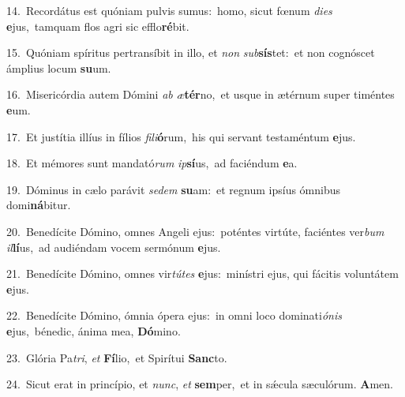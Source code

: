 {\numbfont\textcolor{\numbcolor}{14.}}~Recordátus est quóniam pulvis sumus:~\dagger homo, sicut fœnum \textit{di}\-\textit{es} \textbf{e}\-jus,~\star tamquam flos agri sic efflo\-\textbf{ré}\-bit.\par
{\numbfont\textcolor{\numbcolor}{15.}}~Quóniam spíritus pertransíbit in illo, et \textit{non} \textit{sub}\-\textbf{sís}tet:~\star et non cognóscet ámplius locum \textbf{su}\-um.\par
{\numbfont\textcolor{\numbcolor}{16.}}~Misericórdia autem Dómini \textit{ab} \textit{æ}\-\textbf{tér}no,~\star et usque in ætérnum super timéntes \textbf{e}\-um.\par
{\numbfont\textcolor{\numbcolor}{17.}}~Et justítia illíus in fílios \textit{fi}\-\textit{li}\textbf{ó}rum,~\star his qui servant testaméntum \textbf{e}\-jus.\par
{\numbfont\textcolor{\numbcolor}{18.}}~Et mémores sunt mandató\textit{rum} \textit{ip}\-\textbf{sí}us,~\star ad faciéndum \textbf{e}\-a.\par
{\numbfont\textcolor{\numbcolor}{19.}}~Dóminus in cælo parávit \textit{se}\-\textit{dem} \textbf{su}\-am:~\star et regnum ipsíus ómnibus domi\-\textbf{ná}\-bitur.\par
{\numbfont\textcolor{\numbcolor}{20.}}~Benedícite Dómino, omnes Angeli ejus:~\dagger poténtes virtúte, faciéntes ver\textit{bum} \textit{il}\-\textbf{lí}us,~\star ad audiéndam vocem sermónum \textbf{e}\-jus.\par
{\numbfont\textcolor{\numbcolor}{21.}}~Benedícite Dómino, omnes vir\-\textit{tú}\-\textit{tes} \textbf{e}\-jus:~\star minístri ejus, qui fácitis voluntátem \textbf{e}\-jus.\par
{\numbfont\textcolor{\numbcolor}{22.}}~Benedícite Dómino, ómnia ópera ejus:~\dagger in omni loco dominati\-\textit{ó}\-\textit{nis} \textbf{e}\-jus,~\star bénedic, ánima mea, \textbf{Dó}\-mino.\par
{\numbfont\textcolor{\numbcolor}{23.}}~Glória Pa\-\textit{tri}\-, \textit{et} \textbf{Fí}\-lio,~\star et Spirítui \textbf{Sanc}\-to.\par
{\numbfont\textcolor{\numbcolor}{24.}}~Sicut erat in princípio, et \textit{nunc}\-, \textit{et} \textbf{sem}\-per,~\star et in sǽcula sæculórum. \textbf{A}\-men.\par
